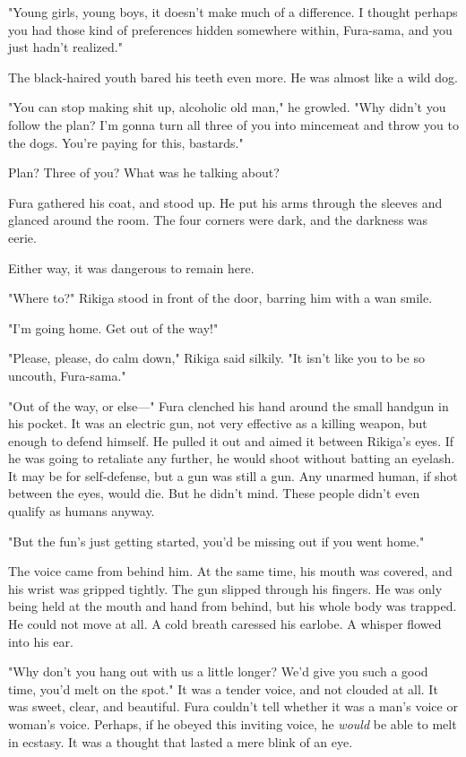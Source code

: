 "Young girls, young boys, it doesn't make much of a difference. I
thought perhaps you had those kind of preferences hidden somewhere
within, Fura-sama, and you just hadn't realized."

The black-haired youth bared his teeth even more. He was almost like a
wild dog.

"You can stop making shit up, alcoholic old man," he growled. "Why
didn't you follow the plan? I'm gonna turn all three of you into
mincemeat and throw you to the dogs. You're paying for this, bastards."

Plan? Three of you? What was he talking about?

Fura gathered his coat, and stood up. He put his arms through the
sleeves and glanced around the room. The four corners were dark, and the
darkness was eerie.

Either way, it was dangerous to remain here.

"Where to?" Rikiga stood in front of the door, barring him with a wan
smile.

"I'm going home. Get out of the way!"

"Please, please, do calm down," Rikiga said silkily. "It isn't like you
to be so uncouth, Fura-sama."

"Out of the way, or else---" Fura clenched his hand around the small
handgun in his pocket. It was an electric gun, not very effective as a
killing weapon, but enough to defend himself. He pulled it out and aimed
it between Rikiga's eyes. If he was going to retaliate any further, he
would shoot without batting an eyelash. It may be for self-defense, but
a gun was still a gun. Any unarmed human, if shot between the eyes,
would die. But he didn't mind. These people didn't even qualify as
humans anyway.

"But the fun's just getting started, you'd be missing out if you went
home."

The voice came from behind him. At the same time, his mouth was covered,
and his wrist was gripped tightly. The gun slipped through his fingers.
He was only being held at the mouth and hand from behind, but his whole
body was trapped. He could not move at all. A cold breath caressed his
earlobe. A whisper flowed into his ear.

"Why don't you hang out with us a little longer? We'd give you such a
good time, you'd melt on the spot." It was a tender voice, and not
clouded at all. It was sweet, clear, and beautiful. Fura couldn't tell
whether it was a man's voice or woman's voice. Perhaps, if he obeyed
this inviting voice, he \emph{would} be able to melt in ecstasy. It was a
thought that lasted a mere blink of an eye.

